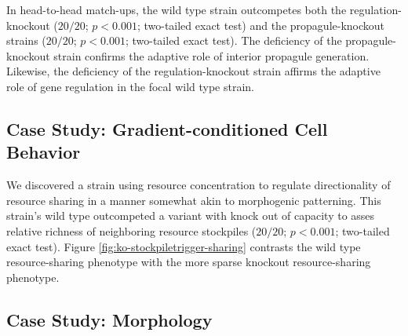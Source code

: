 In head-to-head match-ups, the wild type strain outcompetes both the regulation-knockout ($20/20$; $p < 0.001$; two-tailed exact test) and the propagule-knockout strains
($20/20$; $p < 0.001$; two-tailed exact test).
The deficiency of the propagule-knockout strain confirms the adaptive role of interior propagule generation.
Likewise, the deficiency of the regulation-knockout strain affirms the adaptive role of gene regulation in the focal wild type strain.

\subsection{Case Study: Gradient-conditioned Cell Behavior} \label{sec:gradient-conditioned-behavior}



We discovered a strain using resource concentration to regulate directionality of resource sharing in a manner somewhat akin to morphogenic patterning.
This strain's wild type outcompeted a variant with knock out of capacity to asses relative richness of neighboring resource stockpiles ($20/20$; $p < 0.001$; two-tailed exact test).
Figure \ref{fig:ko-stockpiletrigger-sharing} contrasts the wild type resource-sharing phenotype  with the more sparse knockout resource-sharing phenotype.

\subsection{Case Study: Morphology} \label{sec:morphology}



